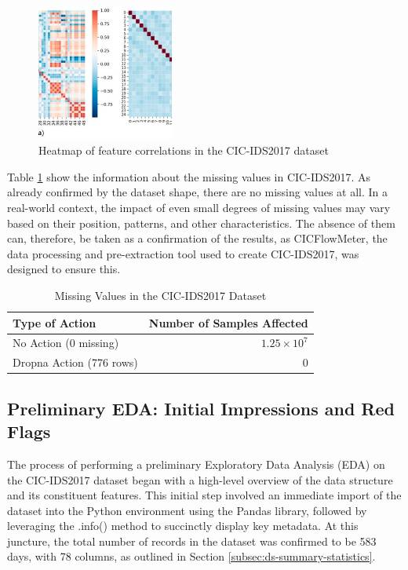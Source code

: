 \begin{figure}[H] 
\centering 
\includegraphics[width=0.4\textwidth]{assets/figures/dataset_heatmap.jpg} 
\caption{Heatmap of feature correlations in the CIC-IDS2017 dataset}
\label{fig:dataset_heatmap} 
\end{figure} 
\parencite{articlers453}

Table \ref{tab:dataset_dropna} show the information about the missing values in CIC-IDS2017. As already confirmed by the dataset shape, there are no missing values at all. In a real-world context, the impact of even small degrees of missing values may vary based on their position, patterns, and other characteristics. The absence of them can, therefore, be taken as a confirmation of the results, as CICFlowMeter, the data processing and pre-extraction tool used to create CIC-IDS2017, was designed to ensure this.


\begin{table}[H] 
\centering 
\caption{Missing Values in the CIC-IDS2017 Dataset} 
\label{tab:dataset_dropna} 
\begin{tabular}{lr} 
\toprule 
Type of Action & Number of Samples Affected \\ 
\midrule 
No Action (0 missing) & $1.25\times10^7$ \\ 
Dropna Action (776 rows) & 0 \\ 
\bottomrule 
\end{tabular} 
\end{table} 


\subsection{Preliminary EDA: Initial Impressions and Red Flags} 
The process of performing a preliminary Exploratory Data Analysis (EDA) on the CIC-IDS2017 dataset began with a high-level overview of the data structure and its constituent features. This initial step involved an immediate import of the dataset into the Python environment using the Pandas library, followed by leveraging the .info() method to succinctly display key metadata. At this juncture, the total number of records in the dataset was confirmed to be 583 days, with 78 columns, as outlined in Section \ref{subsec:ds-summary-statistics}.

